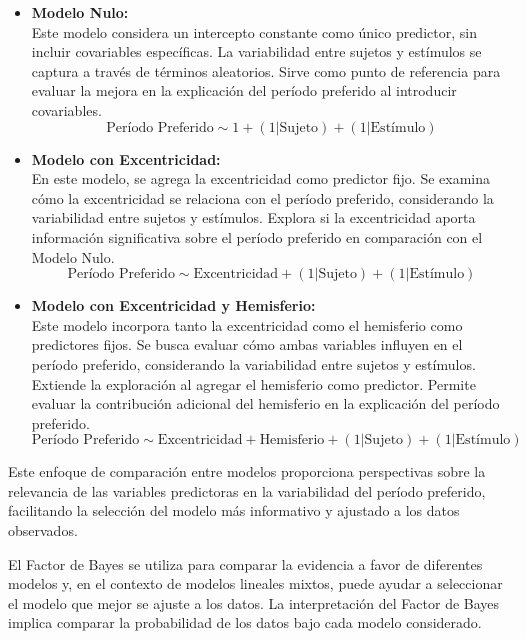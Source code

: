 \begin{itemize}
	\item \textbf{Modelo Nulo:}	\\
	Este modelo considera un intercepto constante como único predictor, sin incluir covariables específicas. La variabilidad entre sujetos y estímulos se captura a través de términos aleatorios. Sirve como punto de referencia para evaluar la mejora en la explicación del período preferido al introducir covariables.
	\begin{equation}
		\text{Período Preferido} \sim 1 + (1|\text{Sujeto}) + (1|\text{Estímulo})	
	\end{equation}

	\item\textbf{Modelo con Excentricidad:}\\
	En este modelo, se agrega la excentricidad como predictor fijo. Se examina cómo la excentricidad se relaciona con el período preferido, considerando la variabilidad entre sujetos y estímulos. Explora si la excentricidad aporta información significativa sobre el período preferido en comparación con el Modelo Nulo.
	\begin{equation}
		\text{Período Preferido} \sim \text{Excentricidad} + (1|\text{Sujeto}) + (1|\text{Estímulo})	
	\end{equation}

	\item \textbf{Modelo con Excentricidad y Hemisferio:}\\
	Este modelo incorpora tanto la excentricidad como el hemisferio como predictores fijos. Se busca evaluar cómo ambas variables influyen en el período preferido, considerando la variabilidad entre sujetos y estímulos. Extiende la exploración al agregar el hemisferio como predictor. Permite evaluar la contribución adicional del hemisferio en la explicación del período preferido.
	\begin{equation}
		\text{Período Preferido} \sim \text{Excentricidad} + \text{Hemisferio} + (1|\text{Sujeto}) + (1|\text{Estímulo})	
	\end{equation}
	
\end{itemize}


Este enfoque de comparación entre modelos proporciona perspectivas sobre la relevancia de las variables predictoras en la variabilidad del período preferido, facilitando la selección del modelo más informativo y ajustado a los datos observados.

El Factor de Bayes se utiliza para comparar la evidencia a favor de diferentes modelos y, en el contexto de modelos lineales mixtos, puede ayudar a seleccionar el modelo que mejor se ajuste a los datos. La interpretación del Factor de Bayes implica comparar la probabilidad de los datos bajo cada modelo considerado.

